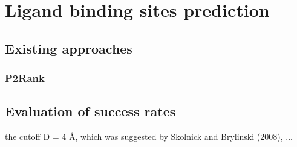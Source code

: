 \chapter{Ligand binding sites prediction} \label{ch:2}

\section{Existing approaches}


\subsection{P2Rank}

\section{Evaluation of success rates}



 the cutoff D = 4 Å, which was suggested by Skolnick and Brylinski (2008),
...